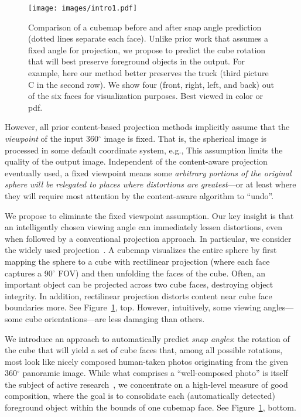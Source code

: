 \begin{figure}[t]
\centering
\renewcommand{\tabcolsep}{0pt}
\texttt{[image: images/intro1.pdf]}%
\caption{Comparison of a cubemap before and after snap angle prediction (dotted lines separate each face). 
Unlike prior work that assumes a fixed angle for projection, we propose to predict the cube rotation that will best preserve foreground objects in the output.  For example, here our method better preserves
the truck (third picture C in the second row).  We show four (front, right, left, and back) out of the six faces for visualization purposes. Best viewed in color or pdf.}%
\label{fig:intro}
\vspace{-13pt}
\end{figure}


However, all prior  content-based projection methods implicitly assume that the \emph{viewpoint} of the input 360$^{\circ}$ image is fixed.  That is, the spherical image is processed in some default coordinate system, e.g.,  This assumption limits the quality of the output image.  Independent of the content-aware projection eventually used, a fixed viewpoint means some \emph{arbitrary portions of the original sphere will be relegated to places where distortions are greatest}---or at least where they will require most attention by the content-aware algorithm to ``undo''.  

We propose to eliminate the fixed viewpoint assumption.  Our key insight is that an intelligently chosen viewing angle can immediately lessen distortions, even when followed by a conventional projection approach.  In particular, we consider the widely used  projection~\cite{greene1986environment,fb2015cubemap,google2017eac}.  A cubemap visualizes the entire sphere by first mapping the sphere to a cube with rectilinear projection (where each face captures a 90$^{\circ}$ FOV) and then unfolding the faces of the cube.  Often, an important object can be projected across two cube faces, destroying object integrity.  In addition, rectilinear projection distorts content near cube face boundaries more.  See Figure~\ref{fig:intro}, top.  However, intuitively, some viewing angles---some cube orientations---are less damaging than others.

We introduce an approach to automatically predict \emph{snap angles}: the rotation of the cube that will yield a set of cube faces that, among all possible rotations, most look like nicely composed human-taken photos originating from the given 360$^{\circ}$ panoramic image.   While what comprises a ``well-composed photo'' is itself the subject of active research~\cite{kong2016aesthetics,isola2011makes,xiong2014detecting,gygli2013interestingness,ICCV15_Khosla}, we concentrate on a high-level measure of good composition, where the goal is to consolidate each (automatically detected) foreground object within the bounds of one cubemap face.   See Figure~\ref{fig:intro}, bottom.


